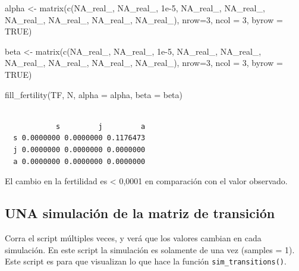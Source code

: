 \documentclass[
  12pt,
  letterpaper,
]{book}
\newenvironment{Shaded}{\begin{snugshade}}{\end{snugshade}}
\newcommand{\AttributeTok}[1]{\textcolor[rgb]{0.40,0.45,0.13}{#1}}
\newcommand{\ConstantTok}[1]{\textcolor[rgb]{0.56,0.35,0.01}{#1}}
\newcommand{\DecValTok}[1]{\textcolor[rgb]{0.68,0.00,0.00}{#1}}
\newcommand{\FloatTok}[1]{\textcolor[rgb]{0.68,0.00,0.00}{#1}}
\newcommand{\FunctionTok}[1]{\textcolor[rgb]{0.28,0.35,0.67}{#1}}
\newcommand{\NormalTok}[1]{\textcolor[rgb]{0.00,0.23,0.31}{#1}}
\newcommand{\OtherTok}[1]{\textcolor[rgb]{0.00,0.23,0.31}{#1}}
\begin{document}
\begin{Shaded}
\begin{Highlighting}[]
\NormalTok{alpha }\OtherTok{\textless{}{-}} \FunctionTok{matrix}\NormalTok{(}\FunctionTok{c}\NormalTok{(}\ConstantTok{NA\_real\_}\NormalTok{, }\ConstantTok{NA\_real\_}\NormalTok{, }\FloatTok{1e{-}5}\NormalTok{,}
                  \ConstantTok{NA\_real\_}\NormalTok{, }\ConstantTok{NA\_real\_}\NormalTok{, }\ConstantTok{NA\_real\_}\NormalTok{,}
                  \ConstantTok{NA\_real\_}\NormalTok{, }\ConstantTok{NA\_real\_}\NormalTok{, }\ConstantTok{NA\_real\_}\NormalTok{), }\AttributeTok{nrow=}\DecValTok{3}\NormalTok{, }\AttributeTok{ncol =} \DecValTok{3}\NormalTok{, }\AttributeTok{byrow =} \ConstantTok{TRUE}\NormalTok{)}

\NormalTok{beta }\OtherTok{\textless{}{-}} \FunctionTok{matrix}\NormalTok{(}\FunctionTok{c}\NormalTok{(}\ConstantTok{NA\_real\_}\NormalTok{, }\ConstantTok{NA\_real\_}\NormalTok{, }\FloatTok{1e{-}5}\NormalTok{,}
                 \ConstantTok{NA\_real\_}\NormalTok{, }\ConstantTok{NA\_real\_}\NormalTok{, }\ConstantTok{NA\_real\_}\NormalTok{,}
                 \ConstantTok{NA\_real\_}\NormalTok{, }\ConstantTok{NA\_real\_}\NormalTok{, }\ConstantTok{NA\_real\_}\NormalTok{), }\AttributeTok{nrow=}\DecValTok{3}\NormalTok{, }\AttributeTok{ncol =} \DecValTok{3}\NormalTok{, }\AttributeTok{byrow =} \ConstantTok{TRUE}\NormalTok{)}

\FunctionTok{fill\_fertility}\NormalTok{(TF, N, }\AttributeTok{alpha =}\NormalTok{ alpha, }\AttributeTok{beta =}\NormalTok{ beta)}
\end{Highlighting}
\end{Shaded}

\begin{verbatim}
   
            s         j         a
  s 0.0000000 0.0000000 0.1176473
  j 0.0000000 0.0000000 0.0000000
  a 0.0000000 0.0000000 0.0000000
\end{verbatim}

El cambio en la fertilidad es \textless{} 0,0001 en comparación con el
valor observado.

\subsection{UNA simulación de la matriz de
transición}\label{una-simulaciuxf3n-de-la-matriz-de-transiciuxf3n}

Corra el script múltiples veces, y verá que los valores cambian en cada
simulación. En este script la simulación es solamente de una vez
(samples = 1). Este script es para que visualizan lo que hace la función
\texttt{sim\_transitions()}.
\end{document}
